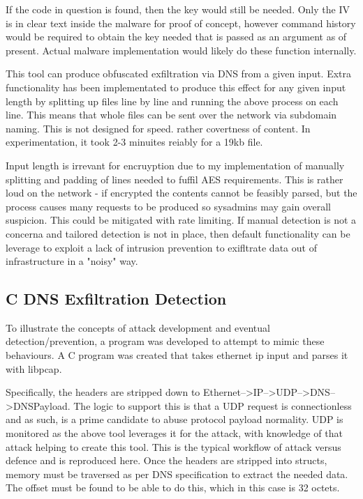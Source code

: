 If the code in question is found, then the key would still be needed. Only the IV is in clear text inside the malware for proof of concept, however command history would be required to obtain the key needed that is passed as an argument as of present. 
Actual malware implementation would likely do these function internally. 


This tool can produce obfuscated exfiltration via DNS from a given input. Extra functionality has been implementated to produce this effect for any given input length by splitting up files line by line and running the above process on each line. This means that whole files can be sent over the network via subdomain naming. This is not designed for speed. rather covertness of content. 
In experimentation, it took 2-3 minuites reiably for a 19kb file. 

Input length is irrevant for encruyption due to my implementation of manually splitting and padding of lines needed to fuffil AES requirements. This is rather loud on the network - if encrypted the contents cannot be feasibly parsed, but the process causes many requests to be produced so sysadmins may gain overall suspicion.
This could be mitigated with rate limiting. If manual detection is not a concerna and tailored detection is not in place, then default functionality can be leverage to exploit a lack of intrusion prevention to exifltrate data out of infrastructure in a "noisy" way.


\subsection{C DNS Exfiltration Detection}
To illustrate the concepts of attack development and eventual detection/prevention, a program was developed to attempt to mimic these behaviours. A C program was created that takes ethernet ip input and parses it with libpcap. 

Specifically, the headers are stripped down to Ethernet-->IP-->UDP-->DNS-->DNSPayload. The logic to support this is that a UDP request is connectionless and as such, is a prime candidate to abuse protocol payload normality. UDP is monitored as the above tool leverages it for the attack, with knowledge of that attack helping to create this tool. This is the typical workflow of attack versus defence and is reproduced here.
Once the headers are stripped into structs, memory must be traversed as per DNS specification to extract the needed data. The offset must be found to be able to do this, which in this case is 32 octets. 

